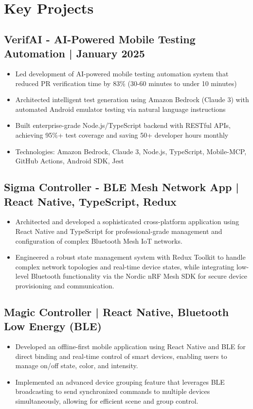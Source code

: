 \documentclass[11pt,a4paper]{article}
\begin{document}
\section{Key Projects}

\subsection{VerifAI - AI-Powered Mobile Testing Automation | January 2025}
\begin{itemize}
    \item Led development of AI-powered mobile testing automation system that reduced PR verification time by 83\% (30-60 minutes to under 10 minutes)
    \item Architected intelligent test generation using Amazon Bedrock (Claude 3) with automated Android emulator testing via natural language instructions
    \item Built enterprise-grade Node.js/TypeScript backend with RESTful APIs, achieving 95\%+ test coverage and saving 50+ developer hours monthly
    \item Technologies: Amazon Bedrock, Claude 3, Node.js, TypeScript, Mobile-MCP, GitHub Actions, Android SDK, Jest
\end{itemize}

\subsection{Sigma Controller - BLE Mesh Network App | React Native, TypeScript, Redux}
\begin{itemize}
    \item Architected and developed a sophisticated cross-platform application using React Native and TypeScript for professional-grade management and configuration of complex Bluetooth Mesh IoT networks.
    
    \item Engineered a robust state management system with Redux Toolkit to handle complex network topologies and real-time device states, while integrating low-level Bluetooth functionality via the Nordic nRF Mesh SDK for secure device provisioning and communication.
\end{itemize}


\subsection{Magic Controller | React Native, Bluetooth Low Energy (BLE)}
\begin{itemize}
    \item Developed an offline-first mobile application using React Native and BLE for direct binding and real-time control of smart devices, enabling users to manage on/off state, color, and intensity.
    
    \item Implemented an advanced device grouping feature that leverages BLE broadcasting to send synchronized commands to multiple devices simultaneously, allowing for efficient scene and group control.
\end{itemize}
\end{document}
